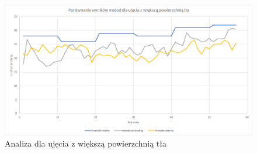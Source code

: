 \documentclass[a4paper]{article}
\begin{document}
\begin{figure}[H]
  \includegraphics[width=\linewidth]{resources/img10.png}
  \caption{Analiza dla ujęcia z większą powierzchnią tła}
\end{figure}
\end{document}
